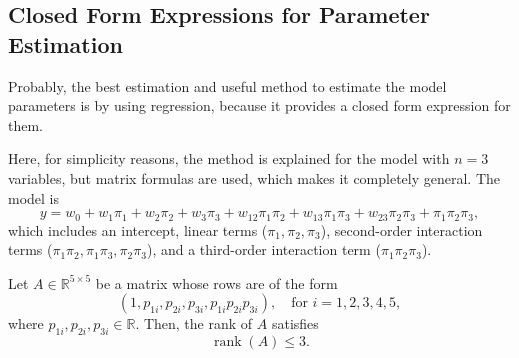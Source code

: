 \documentclass[
	11pt, %
	fleqn, %
	a4paper, %
]{LegrandOrangeBook}
\DeclareMathOperator{\rank}{rank}
\begin{document}
\subsection{Closed Form Expressions for Parameter Estimation}
Probably, the best estimation and useful method to estimate the model parameters is by using regression, because it provides a closed form expression for them.

Here, for simplicity reasons, the method is explained for the model with $n=3$ variables, but matrix formulas are used, which makes it completely general. The model is
\begin{equation}
y = w_0 + w_1\pi_1 + w_2\pi_2 + w_3\pi_3 + w_{12}\pi_1\pi_2 + w_{13}\pi_1\pi_3 + w_{23}\pi_2\pi_3 + \pi_1\pi_2\pi_3,
\label{eq:regressionmodel}
\end{equation}
which includes an intercept, linear terms ($\pi_1, \pi_2, \pi_3$), second-order interaction terms ($\pi_1\pi_2, \pi_1\pi_3, \pi_2\pi_3$), and a third-order interaction term ($\pi_1\pi_2\pi_3$).

\begin{theorem}
Let $A \in \mathbb{R}^{5 \times 5}$ be a matrix whose rows are of the form
\[
(1, p_{1i}, p_{2i}, p_{3i}, p_{1i} p_{2i} p_{3i}), \quad \text{for } i = 1, 2, 3, 4, 5,
\]
where $p_{1i}, p_{2i}, p_{3i} \in \mathbb{R}$. Then, the rank of $A$ satisfies
\[
\rank(A) \leq 3.
\]
\end{theorem}
\end{document}
